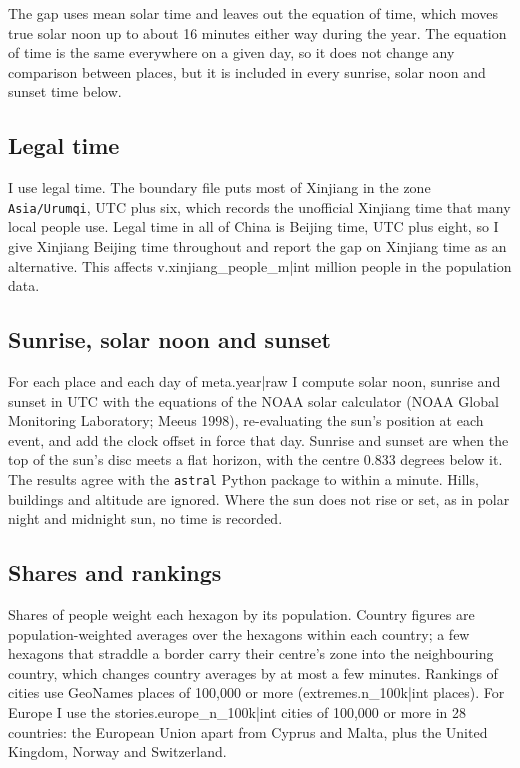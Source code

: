 \documentclass[11pt,a4paper]{article}
\begin{document}
The gap uses mean solar time and leaves out the equation of time, which moves true solar noon up to about 16 minutes either way during the year. The equation of time is the same everywhere on a given day, so it does not change any comparison between places, but it is included in every sunrise, solar noon and sunset time below.

\subsection{Legal time}

I use legal time. The boundary file puts most of Xinjiang in the zone \texttt{Asia/Urumqi}, UTC plus six, which records the unofficial Xinjiang time that many local people use. Legal time in all of China is Beijing time, UTC plus eight, so I give Xinjiang Beijing time throughout and report the gap on Xinjiang time as an alternative. This affects {{v.xinjiang_people_m|int}} million people in the population data.

\subsection{Sunrise, solar noon and sunset}

For each place and each day of {{meta.year|raw}} I compute solar noon, sunrise and sunset in UTC with the equations of the NOAA solar calculator (NOAA Global Monitoring Laboratory; Meeus 1998), re-evaluating the sun's position at each event, and add the clock offset in force that day. Sunrise and sunset are when the top of the sun's disc meets a flat horizon, with the centre 0.833 degrees below it. The results agree with the \texttt{astral} Python package to within a minute. Hills, buildings and altitude are ignored. Where the sun does not rise or set, as in polar night and midnight sun, no time is recorded.

\subsection{Shares and rankings}

Shares of people weight each hexagon by its population. Country figures are population-weighted averages over the hexagons within each country; a few hexagons that straddle a border carry their centre's zone into the neighbouring country, which changes country averages by at most a few minutes. Rankings of cities use GeoNames places of 100,000 or more ({{extremes.n_100k|int}} places). For Europe I use the {{stories.europe_n_100k|int}} cities of 100,000 or more in 28 countries: the European Union apart from Cyprus and Malta, plus the United Kingdom, Norway and Switzerland.
\end{document}
